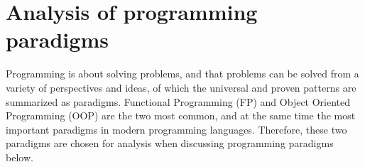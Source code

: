 \section{Analysis of programming paradigms}


Programming is about solving problems,
and that problems can be solved from a variety of perspectives
and ideas, of which the universal and proven patterns are
summarized as paradigms.
Functional Programming (FP) and Object Oriented Programming (OOP)
are the two most common, and at the same time the most important paradigms
in modern programming languages.
Therefore, these two paradigms are chosen for analysis when discussing
programming paradigms below.




